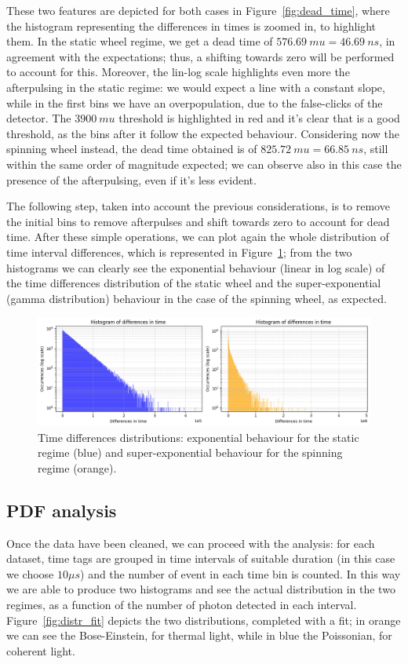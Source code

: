 \documentclass[prl,twocolumn]{revtex4-1}
\begin{document}
These two features are depicted for both cases in Figure~\ref{fig:dead_time}, where the histogram representing the differences in times is zoomed in, to highlight them. In the static wheel regime, we get a dead time of $576.69 \: mu = 46.69 \:ns$, in agreement with the expectations; thus, a shifting towards zero will be performed to account for this. Moreover, the lin-log scale highlights even more the afterpulsing in the static regime: we would expect a line with a constant slope, while in the first bins we have an overpopulation, due to the false-clicks of the detector. The $3900 \: mu$ threshold is highlighted in red and it's clear that is a good threshold, as the bins after it follow the expected behaviour. Considering now the spinning wheel instead, the dead time obtained is of $825.72 \: mu = 66.85 \: ns$, still within the same order of magnitude expected; we can observe also in this case the presence of the afterpulsing, even if it's less evident.

The following step, taken into account the previous considerations, is to remove the initial bins to remove afterpulses and shift towards zero to account for dead time. After these simple operations, we can plot again the whole distribution of time interval differences, which is represented in Figure~\ref{fig:diff_time_cleaned}; from the two histograms we can clearly see the exponential behaviour (linear in log scale) of the time differences distribution of the static wheel and the super-exponential (gamma distribution) behaviour in the case of the spinning wheel, as expected. 

\begin{figure}[!t]
    \centering
    \includegraphics[width=\linewidth]{Images/hist_diff_time_cleaned.png}
    \caption{Time differences distributions: exponential behaviour for the static regime (blue) and super-exponential behaviour for the spinning regime (orange).}
    \label{fig:diff_time_cleaned}
\end{figure}

\subsection{PDF analysis}
Once the data have been cleaned, we can proceed with the analysis: for each dataset, time tags are grouped in time intervals of suitable duration (in this case we choose $10 \mu s$) and the number of event in each time bin is counted. In this way we are able to produce two histograms and see the actual distribution in the two regimes, as a function of the number of photon detected in each interval. Figure~\ref{fig:distr_fit} depicts the two distributions, completed with a fit; in orange we can see the Bose-Einstein, for thermal light, while in blue the Poissonian, for coherent light. 
\end{document}
